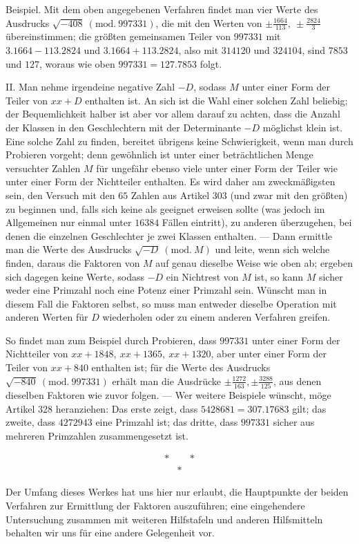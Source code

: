 Beispiel. Mit dem oben angegebenen Verfahren findet man vier Werte des Ausdrucks \(\surd{-408}\ (\mathrm{mod.}\ 997331)\), die mit den Werten von \(\pm\frac{1664}{113},\allowbreak \ \pm\frac{2824}{3}\) übereinstimmen; die größten gemeinsamen Teiler von \(997331\) mit \(3.1664-113.2824\) und \(3.1664+113.2824\), also mit \(314120\) und \(324104\), sind \(7853\) und \(127\), woraus wie oben \(997331=127.7853\) folgt.

II. Man nehme irgendeine negative Zahl \(-D\), sodass \(M\) unter einer Form der Teiler von \(xx+D\) enthalten ist. An sich ist die Wahl einer solchen Zahl beliebig; der Bequemlichkeit halber ist aber vor allem darauf zu achten, dass die Anzahl der Klassen in den Geschlechtern mit der Determinante \(-D\) möglichst klein ist. Eine solche Zahl zu finden, bereitet übrigens keine Schwierigkeit, wenn man durch Probieren vorgeht; denn gewöhnlich ist unter einer beträchtlichen Menge versuchter Zahlen \(M\) für ungefähr ebenso viele unter einer Form der Teiler wie unter einer Form der Nichtteiler enthalten. Es wird daher am zweckmäßigsten sein, den Versuch mit den \(65\) Zahlen aus Artikel 303 (und zwar mit den größten) zu beginnen und, falls sich keine als geeignet erweisen sollte (was jedoch im Allgemeinen nur einmal unter \(16384\) Fällen eintritt), zu anderen überzugehen, bei denen die einzelnen Geschlechter je zwei Klassen enthalten. — Dann ermittle man die Werte des Ausdrucks \(\surd{-D}\ (\mathrm{mod.}\ M)\) und leite, wenn sich welche finden, daraus die Faktoren von \(M\) auf genau dieselbe Weise wie oben ab; ergeben sich dagegen keine Werte, sodass \(-D\) ein Nichtrest von \(M\) ist, so kann \(M\) sicher weder eine Primzahl noch eine Potenz einer Primzahl sein. Wünscht man in diesem
Fall die Faktoren selbst, so muss man entweder dieselbe Operation mit anderen Werten für \(D\) wiederholen oder zu einem anderen Verfahren greifen.

So findet man zum Beispiel durch Probieren, dass \(997331\) unter einer Form der Nichtteiler von \(xx+1848,\allowbreak \ xx+1365,\allowbreak \ xx+1320\), aber unter einer Form der Teiler von \(xx+840\) enthalten ist; für die Werte des Ausdrucks \(\surd{-840}\ (\mathrm{mod.}\ 997331)\) erhält man die Ausdrücke \(\pm\frac{1272}{163},\allowbreak \pm\frac{3288}{125}\), aus denen dieselben Faktoren wie zuvor folgen. — Wer weitere Beispiele wünscht, möge Artikel 328 heranziehen: Das erste zeigt, dass \(5428681=307.17683\) gilt; das zweite, dass \(4272943\) eine Primzahl ist; das dritte, dass \(997331\) sicher aus mehreren Primzahlen zusammengesetzt ist.

\[\begin{array}{ccc}*& &*\\ &*&\end{array}\]

Der Umfang dieses Werkes hat uns hier nur erlaubt, die Hauptpunkte der beiden Verfahren zur Ermittlung der Faktoren auszuführen; eine eingehendere Untersuchung zusammen mit weiteren Hilfstafeln und anderen Hilfsmitteln behalten wir uns für eine andere Gelegenheit vor.
\clearpage
